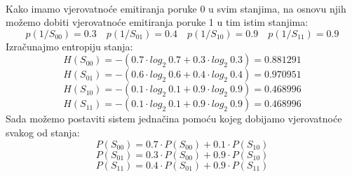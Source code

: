 \documentclass[12pt]{article}
\begin{document}
\begin{enumerate}
\\
Kako imamo vjerovatnoće emitiranja poruke 0 u svim stanjima, na osnovu
njih možemo dobiti vjerovatnoće emitiranja poruke 1 u tim istim stanjima:
\begin{equation*}
    p(1/S_{00}) = 0.3 \quad p(1/S_{01}) = 0.4 \quad p(1/S_{10}) = 0.9 \quad p(1/S_{11}) = 0.9 
\end{equation*}
Izračunajmo entropiju stanja: \\
\begin{equation*}
    H(S_{00}) = -(0.7 \cdot log_2~0.7 + 0.3 \cdot log_2~0.3) = 0.881291
\end{equation*}
\begin{equation*}
    H(S_{01}) = -(0.6 \cdot log_2~0.6 + 0.4 \cdot log_2~0.4) = 0.970951
\end{equation*}
\begin{equation*}
    H(S_{10}) = -(0.1 \cdot log_2~0.1 + 0.9 \cdot log_2~0.9) = 0.468996
\end{equation*}
\begin{equation*}
    H(S_{11}) = -(0.1 \cdot log_2~0.1 + 0.9 \cdot log_2~0.9) = 0.468996
\end{equation*}
Sada možemo postaviti sistem jednačina pomoću kojeg dobijamo vjerovatnoće svakog od stanja:
\begin{equation*}
    P(S_{00}) = 0.7 \cdot P(S_{00}) + 0.1 \cdot P(S_{10})
\end{equation*}
\begin{equation*}
    P(S_{01}) = 0.3 \cdot P(S_{00}) + 0.9 \cdot P(S_{10})
\end{equation*}
\begin{equation*}
    P(S_{11}) = 0.4 \cdot P(S_{01}) + 0.9 \cdot P(S_{11})
\end{equation*}

\end{enumerate}
\end{document}
